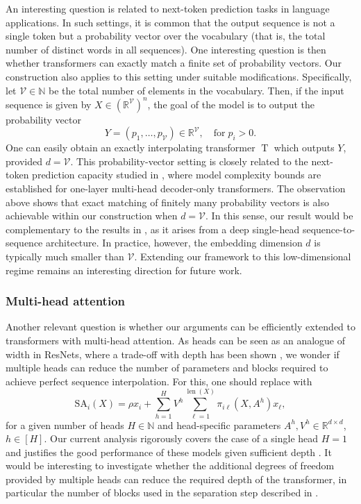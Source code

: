 \documentclass[pdflatex,sn-mathphys-num]{sn-jnl}%
\theoremstyle{thmstyleone}%
\theoremstyle{thmstyletwo}%
\theoremstyle{thmstylethree}%
\numberwithin{equation}{section}
\newcommand{\R}{\mathbb{R}}
\newcommand{\N}{\mathbb{N}}
\DeclareMathOperator{\T}{\mathrm{T}}
\DeclareMathOperator{\len}{len}
\begin{document}
An interesting question is related to next-token prediction tasks in language applications. In such settings, it is common that the output sequence is not a single token but a probability vector over the vocabulary (that is, the total number of distinct words in all sequences). One interesting question is then whether transformers can exactly match a finite set of probability vectors. Our construction also applies to this setting under suitable modifications. Specifically, let $\mathcal{V}\in \N$ be the total number of elements in the vocabulary. Then, if the input sequence is given by $X \in (\R^{\mathcal{V}})^n$, the goal of the model is to output the probability vector
$$
Y = (p_1, \dots, p_\mathcal{V}) \in \R^\mathcal{V}, \quad \text{for} \; p_i > 0.
$$
One can easily obtain an exactly interpolating transformer $\T$ which outputs $Y$, provided $d = \mathcal{V}$. This probability-vector setting is closely related to the next-token prediction capacity studied in \cite{madden2025next}, where model complexity bounds are established for one-layer multi-head decoder-only transformers. The observation above shows that exact matching of finitely many probability vectors is also achievable within our construction when $d=\mathcal{V}$. In this sense, our result would be complementary to the results in \cite{madden2025next}, as it arises from a deep single-head sequence-to-sequence architecture. In practice, however, the embedding dimension $d$ is typically much smaller than $\mathcal{V}$. Extending our framework to this low-dimensional regime remains an interesting direction for future work.

\subsubsection{Multi-head attention}\label{sss:multihead}

Another relevant question is whether our arguments can be efficiently extended to transformers with multi-head attention. As heads can be seen as an analogue of width in ResNets, where a trade-off with depth has been shown \cite{alvarez2024interplay}, we wonder if multiple heads can reduce the number of parameters and blocks required to achieve perfect sequence interpolation. For this, one should replace  with
$$
    \mathrm{SA}_i(X) = \rho x_i + \sum_{h=1}^H V^h \sum_{\ell = 1}^{\len(X)} \pi_{i\ell}(X,A^h)x_\ell,
$$
for a given number of heads $H\in \N$ and head-specific parameters $A^h, V^h \in \R^{d\times d}$, $h\in [H]$. Our current analysis rigorously covers the case of a single head $H = 1$ and justifies the good performance of these models given sufficient depth \cite{michel2019sixteen}. It would be interesting to investigate whether the additional degrees of freedom provided by multiple heads can reduce the required depth of the transformer, in particular the number of blocks used in the separation step described in .
\end{document}
